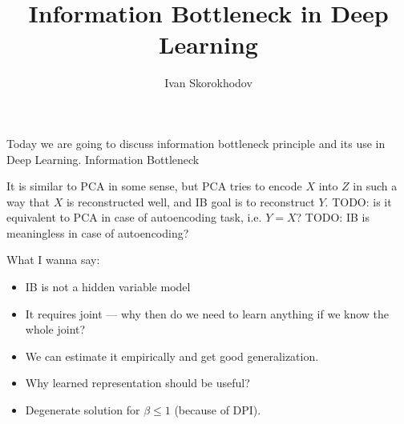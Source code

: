 \documentclass{article}
\title{Information Bottleneck in Deep Learning}
\author{Ivan Skorokhodov}
\begin{document}
\maketitle

Today we are going to discuss information bottleneck principle and its use in Deep Learning.
Information Bottleneck

It is similar to PCA in some sense, but PCA tries to encode $X$ into $Z$ in such a way that $X$ is reconstructed well, and IB goal is to reconstruct $Y$.
TODO: is it equivalent to PCA in case of autoencoding task, i.e. $Y = X$?
TODO: IB is meaningless in case of autoencoding?

What I wanna say:
\begin{itemize}
    \item IB is not a hidden variable model
    \item It requires joint --- why then do we need to learn anything if we know the whole joint?
    \item We can estimate it empirically and get good generalization.
    \item Why learned representation should be useful?
    \item Degenerate solution for $\beta \leq 1$ (because of DPI).
\end{itemize}
\end{document}
